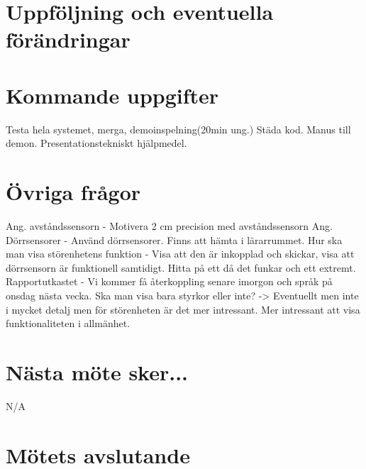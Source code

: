 \documentclass{article}
\begin{document}
\section{Uppföljning och eventuella förändringar} 

\section{Kommande uppgifter}
Testa hela systemet, merga, demoinspelning(20min ung.)
\newline
Städa kod.
\newline
Manus till demon.
\newline
Presentationstekniskt hjälpmedel.


\section{Övriga frågor} 
Ang. avståndssensorn - Motivera 2 cm precision med avståndssensorn
\newline
Ang. Dörrsensorer - Använd dörrsensorer. Finns att hämta i lärarrummet.
\newline
Hur ska man visa störenhetens funktion - Visa att den är inkopplad och skickar, visa att dörrsensorn är funktionell samtidigt. Hitta på ett då det funkar och ett extremt.
\newline
Rapportutkastet - Vi kommer få återkoppling senare imorgon och språk på onsdag nästa vecka.
Ska man visa bara styrkor eller inte? -> Eventuellt men inte i mycket detalj men för störenheten är det mer intressant. Mer intressant att visa funktionaliteten i allmänhet.

\section{Nästa möte sker...} 

N/A
\section{Mötets avslutande} 
\end{document}
